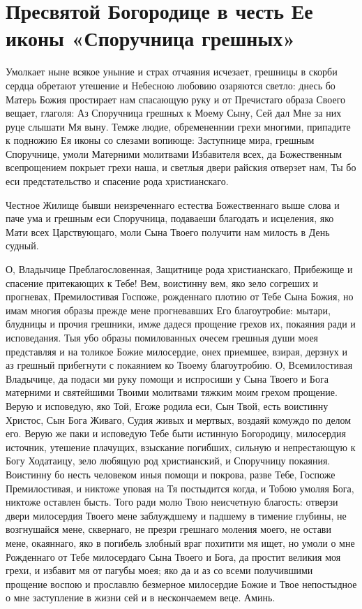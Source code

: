 \section{Пресвятой Богородице в честь Ее иконы «Споручница грешных»}\begin{mymulticols}


Умолкает ныне всякое уныние и страх отчаяния исчезает, грешницы в скорби сердца обретают утешение и Hебесною любовию озаряются светло: днесь бо Матерь Божия простирает нам спасающую руку и от Пречистаго образа Своего вещает, глаголя: Аз Споручница грешных к Моему Сыну, Сей дал Мне за них руце слышати Мя выну. Темже людие, обремененнии грехи многими, припадите к подножию Ея иконы со слезами вопиюще: Заступнице мира, грешным Споручнице, умоли Матерними молитвами Избавителя всех, да Божественным всепрощением покрыет грехи наша, и светлыя двери райския отверзет нам, Ты бо еси предстательство и спасение рода христианскаго.


Честное Жилище бывши неизреченнаго естества Божественнаго выше слова и паче ума и грешным еси Споручница, подаваеши благодать и исцеления, яко Мати всех Царствующаго, моли Сына Твоего получити нам милость в День судный.


О, Владычице Преблагословенная, Защитнице рода христианскаго, Прибежище и спасение притекающих к Тебе! Вем, воистинну вем, яко зело согреших и прогневах, Премилостивая Госпоже, рожденнаго плотию от Тебе Сына Божия, но имам многия образы прежде мене прогневавших Его благоутробие: мытари, блудницы и прочия грешники, имже дадеся прощение грехов их, покаяния ради и исповедания. Тыя убо образы помилованных очесем грешныя души моея представляя и на толикое Божие милосердие, онех приемшее, взирая, дерзнух и аз грешный прибегнути с покаянием ко Твоему благоутробию. О, Всемилостивая Владычице, да подаси ми руку помощи и испросиши у Сына Твоего и Бога матерними и святейшими Твоими молитвами тяжким моим грехом прощение. Верую и исповедую, яко Той, Егоже родила еси, Сын Твой, есть воистинну Христос, Сын Бога Живаго, Судия живых и мертвых, воздаяй комуждо по делом его. Верую же паки и исповедую Тебе быти истинную Богородицу, милосердия источник, утешение плачущих, взыскание погибших, сильную и непрестающую к Богу Ходатаицу, зело любящую род христианский, и Споручницу покаяния. Воистинну бо несть человеком иныя помощи и покрова, разве Тебе, Госпоже Премилостивая, и никтоже уповая на Тя постыдится когда, и Тобою умоляя Бога, никтоже оставлен бысть. Того ради молю Твою неисчетную благость: отверзи двери милосердия Твоего мене заблуждшему и падшему в тимение глубины, не возгнушайся мене, сквернаго, не презри грешнаго моления моего, не остави мене, окаяннаго, яко в погибель злобный враг похитити мя ищет, но умоли о мне Рожденнаго от Тебе милосердаго Сына Твоего и Бога, да простит великия моя грехи, и избавит мя от пагубы моея; яко да и аз со всеми получившими прощение воспою и прославлю безмерное милосердие Божие и Твое непостыдное о мне заступление в жизни сей и в нескончаемем веце. Аминь.


\end{mymulticols}
